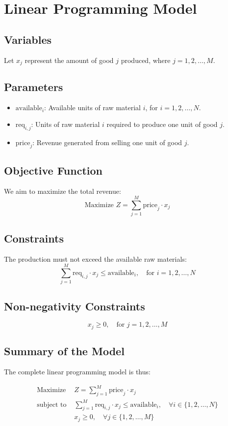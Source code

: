 \documentclass{article}
\begin{document}
\section*{Linear Programming Model}

\subsection*{Variables}
Let \( x_j \) represent the amount of good \( j \) produced, where \( j = 1, 2, \ldots, M \).

\subsection*{Parameters}
\begin{itemize}
    \item \( \text{available}_i \): Available units of raw material \( i \), for \( i = 1, 2, \ldots, N \).
    \item \( \text{req}_{i,j} \): Units of raw material \( i \) required to produce one unit of good \( j \).
    \item \( \text{price}_j \): Revenue generated from selling one unit of good \( j \).
\end{itemize}

\subsection*{Objective Function}
We aim to maximize the total revenue:
\[
\text{Maximize } Z = \sum_{j=1}^{M} \text{price}_j \cdot x_j
\]

\subsection*{Constraints}
The production must not exceed the available raw materials:
\[
\sum_{j=1}^{M} \text{req}_{i,j} \cdot x_j \leq \text{available}_i, \quad \text{for } i = 1, 2, \ldots, N
\]

\subsection*{Non-negativity Constraints}
\[
x_j \geq 0, \quad \text{for } j = 1, 2, \ldots, M
\]

\subsection*{Summary of the Model}
The complete linear programming model is thus:

\[
\begin{align*}
\text{Maximize } & Z = \sum_{j=1}^{M} \text{price}_j \cdot x_j \\
\text{subject to } & \sum_{j=1}^{M} \text{req}_{i,j} \cdot x_j \leq \text{available}_i, \quad \forall i \in \{1, 2, \ldots, N\} \\
& x_j \geq 0, \quad \forall j \in \{1, 2, \ldots, M\}
\end{align*}
\]
\end{document}
